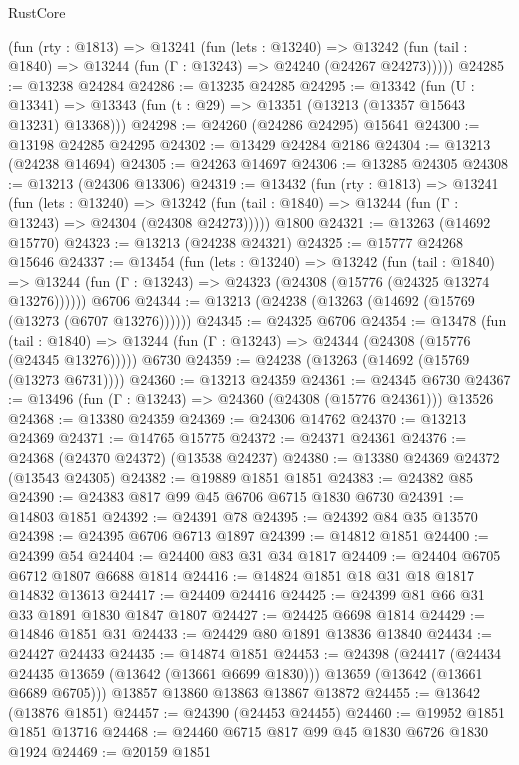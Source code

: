 \begin{lexlean}{RustCore}
\begin{coremodule}
    (fun (rty : @1813) =>
    @13241
      (fun (lets : @13240) =>
      @13242 (fun (tail : @1840) => @13244 (fun (Γ : @13243) => @24240 (@24267 @24273)))))
@24285 := @13238 @24284
@24286 := @13235 @24285
@24295 := @13342
    (fun (U : @13341) => @13343 (fun (t : @29) => @13351 (@13213 (@13357 @15643 @13231) @13368)))
@24298 := @24260 (@24286 @24295) @15641
@24300 := @13198 @24285 @24295
@24302 := @13429 @24284 @2186
@24304 := @13213 (@24238 @14694)
@24305 := @24263 @14697
@24306 := @13285 @24305
@24308 := @13213 (@24306 @13306)
@24319 := @13432
    (fun (rty : @1813) =>
    @13241
      (fun (lets : @13240) =>
      @13242 (fun (tail : @1840) => @13244 (fun (Γ : @13243) => @24304 (@24308 @24273)))))
    @1800
@24321 := @13263 (@14692 @15770)
@24323 := @13213 (@24238 @24321)
@24325 := @15777 @24268 @15646
@24337 := @13454
    (fun (lets : @13240) =>
    @13242
      (fun (tail : @1840) =>
      @13244 (fun (Γ : @13243) => @24323 (@24308 (@15776 (@24325 @13274 @13276))))))
    @6706
@24344 := @13213 (@24238 (@13263 (@14692 (@15769 (@13273 (@6707 @13276))))))
@24345 := @24325 @6706
@24354 := @13478
    (fun (tail : @1840) => @13244 (fun (Γ : @13243) => @24344 (@24308 (@15776 (@24345 @13276)))))
    @6730
@24359 := @24238 (@13263 (@14692 (@15769 (@13273 @6731))))
@24360 := @13213 @24359
@24361 := @24345 @6730
@24367 := @13496 (fun (Γ : @13243) => @24360 (@24308 (@15776 @24361))) @13526
@24368 := @13380 @24359
@24369 := @24306 @14762
@24370 := @13213 @24369
@24371 := @14765 @15775
@24372 := @24371 @24361
@24376 := @24368 (@24370 @24372) (@13538 @24237)
@24380 := @13380 @24369 @24372 (@13543 @24305)
@24382 := @19889 @1851 @1851
@24383 := @24382 @85
@24390 := @24383 @817 @99 @45 @6706 @6715 @1830 @6730
@24391 := @14803 @1851
@24392 := @24391 @78
@24395 := @24392 @84 @35 @13570
@24398 := @24395 @6706 @6713 @1897
@24399 := @14812 @1851
@24400 := @24399 @54
@24404 := @24400 @83 @31 @34 @1817
@24409 := @24404 @6705 @6712 @1807 @6688 @1814
@24416 := @14824 @1851 @18 @31 @18 @1817 @14832 @13613
@24417 := @24409 @24416
@24425 := @24399 @81 @66 @31 @33 @1891 @1830 @1847 @1807
@24427 := @24425 @6698 @1814
@24429 := @14846 @1851 @31
@24433 := @24429 @80 @1891 @13836 @13840
@24434 := @24427 @24433
@24435 := @14874 @1851
@24453 := @24398
    (@24417
      (@24434 @24435 @13659 (@13642 (@13661 @6699 @1830)))
      @13659
      (@13642 (@13661 @6689 @6705)))
    @13857
    @13860
    @13863
    @13867
    @13872
@24455 := @13642 (@13876 @1851)
@24457 := @24390 (@24453 @24455)
@24460 := @19952 @1851 @1851 @13716
@24468 := @24460 @6715 @817 @99 @45 @1830 @6726 @1830 @1924
@24469 := @20159 @1851

\end{coremodule}
\end{lexlean}
